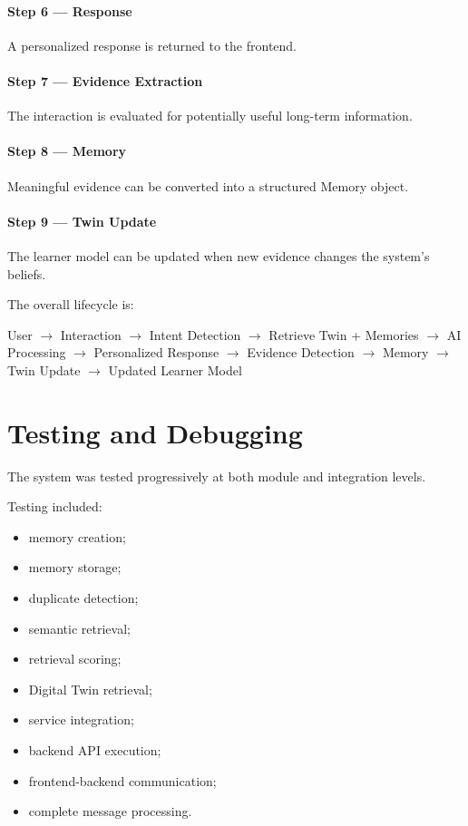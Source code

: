 \documentclass[12pt,a4paper]{article}
\begin{document}
\paragraph{Step 6 — Response} A personalized response is returned to the frontend.

\paragraph{Step 7 — Evidence Extraction} The interaction is evaluated for potentially useful long-term information.

\paragraph{Step 8 — Memory} Meaningful evidence can be converted into a structured Memory object.

\paragraph{Step 9 — Twin Update} The learner model can be updated when new evidence changes the system's beliefs.

The overall lifecycle is:
\begin{center}
User $\rightarrow$ Interaction $\rightarrow$ Intent Detection $\rightarrow$ Retrieve Twin + Memories $\rightarrow$ AI Processing $\rightarrow$ Personalized Response $\rightarrow$ Evidence Detection $\rightarrow$ Memory $\rightarrow$ Twin Update $\rightarrow$ Updated Learner Model
\end{center}

\section{Testing and Debugging}
The system was tested progressively at both module and integration levels.

Testing included:
\begin{itemize}[noitemsep,topsep=2pt]
    \item memory creation;
    \item memory storage;
    \item duplicate detection;
    \item semantic retrieval;
    \item retrieval scoring;
    \item Digital Twin retrieval;
    \item service integration;
    \item backend API execution;
    \item frontend-backend communication;
    \item complete message processing.
\end{itemize}
\end{document}
